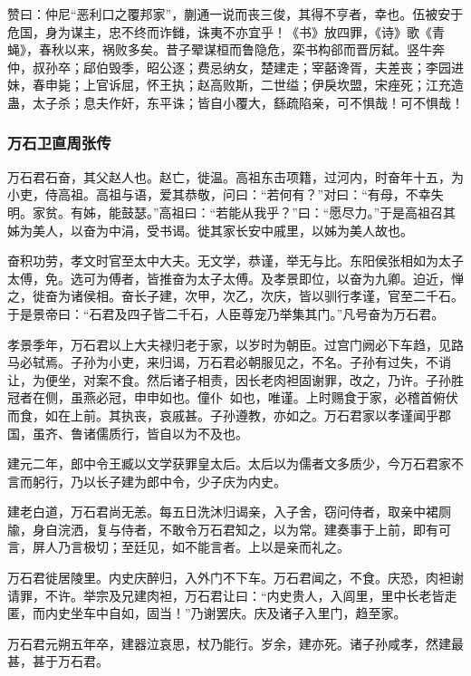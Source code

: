 \documentclass[]{article}
\begin{document}
赞曰：仲尼``恶利口之覆邦家''，蒯通一说而丧三俊，其得不亨者，幸也。伍被安于危国，身为谋主，忠不终而诈雠，诛夷不亦宜乎！《书》放四罪，《诗》歌《青蝇》，春秋以来，祸败多矣。昔子翚谋桓而鲁隐危，栾书构郤而晋厉弑。竖牛奔仲，叔孙卒；郈伯毁季，昭公逐；费忌纳女，楚建走；宰嚭谗胥，夫差丧；李园进妹，春申毙；上官诉屈，怀王执；赵高败斯，二世缢；伊戾坎盟，宋痤死；江充造蛊，太子杀；息夫作奸，东平诛；皆自小覆大，繇疏陷亲，可不惧哉！可不惧哉！

\hypertarget{header-n4029}{%
\subsubsection{万石卫直周张传}\label{header-n4029}}

万石君石奋，其父赵人也。赵亡，徙温。高祖东击项籍，过河内，时奋年十五，为小吏，侍高祖。高祖与语，爱其恭敬，问曰：``若何有？''对曰：``有母，不幸失明。家贫。有姊，能鼓瑟。''高祖曰：``若能从我乎？''曰：``愿尽力。''于是高祖召其姊为美人，以奋为中涓，受书谒。徙其家长安中戚里，以姊为美人故也。

奋积功劳，孝文时官至太中大夫。无文学，恭谨，举无与比。东阳侯张相如为太子太傅，免。选可为傅者，皆推奋为太子太傅。及孝景即位，以奋为九卿。迫近，惮之，徙奋为诸侯相。奋长子建，次甲，次乙，次庆，皆以驯行孝谨，官至二千石。于是景帝曰：``石君及四子皆二千石，人臣尊宠乃举集其门。''凡号奋为万石君。

孝景季年，万石君以上大夫禄归老于家，以岁时为朝臣。过宫门阙必下车趋，见路马必轼焉。子孙为小吏，来归谒，万石君必朝服见之，不名。子孙有过失，不诮让，为便坐，对案不食。然后诸子相责，因长老肉袒固谢罪，改之，乃许。子孙胜冠者在侧，虽燕必冠，申申如也。僮仆如也，唯谨。上时赐食于家，必稽首俯伏而食，如在上前。其执丧，哀戚甚。子孙遵教，亦如之。万石君家以孝谨闻乎郡国，虽齐、鲁诸儒质行，皆自以为不及也。

建元二年，郎中令王臧以文学获罪皇太后。太后以为儒者文多质少，今万石君家不言而躬行，乃以长子建为郎中令，少子庆为内史。

建老白道，万石君尚无恙。每五日洗沐归谒亲，入子舍，窃问侍者，取亲中裙厕牏，身自浣洒，复与侍者，不敢令万石君知之，以为常。建奏事于上前，即有可言，屏人乃言极切；至廷见，如不能言者。上以是亲而礼之。

万石君徙居陵里。内史庆醉归，入外门不下车。万石君闻之，不食。庆恐，肉袒谢请罪，不许。举宗及兄建肉袒，万石君让曰：``内史贵人，入闾里，里中长老皆走匿，而内史坐车中自如，固当！''乃谢罢庆。庆及诸子入里门，趋至家。

万石君元朔五年卒，建器泣哀思，杖乃能行。岁余，建亦死。诸子孙咸孝，然建最甚，甚于万石君。
\end{document}
